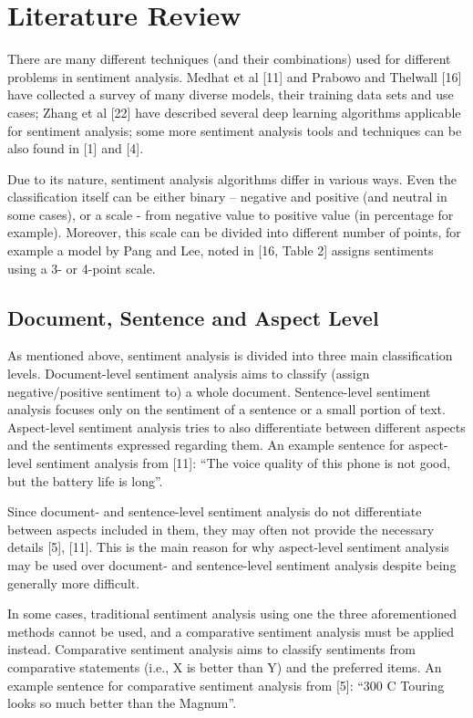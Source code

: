 \documentclass[12pt,journal,compsoc]{IEEEtran}
\begin{document}
\section{Literature Review}
There are many different techniques (and their combinations) used for different problems in sentiment analysis. Medhat et al [11] and Prabowo and Thelwall [16] have collected a survey of many diverse models, their training data sets and use cases; Zhang et al [22] have described several deep learning algorithms applicable for sentiment analysis; some more sentiment analysis tools and techniques can be also found in [1] and [4].

Due to its nature, sentiment analysis algorithms differ in various ways. Even the classification itself can be either binary – negative and positive (and neutral in some cases), or a scale - from negative value to positive value (in percentage for example). Moreover, this scale can be divided into different number of points, for example a model by Pang and Lee, noted in [16, Table 2] assigns sentiments using a 3- or 4-point scale.

\subsection{Document, Sentence and Aspect Level}
As mentioned above, sentiment analysis is divided into three main classification levels. Document-level sentiment analysis aims to classify (assign negative/positive sentiment to) a whole document. Sentence-level sentiment analysis focuses only on the sentiment of a sentence or a small portion of text. Aspect-level sentiment analysis tries to also differentiate between different aspects and the sentiments expressed regarding them. An example sentence for aspect-level sentiment analysis from [11]: “The voice quality of this phone is not good, but the battery life is long”.

Since document- and sentence-level sentiment analysis do not differentiate between aspects included in them, they may often not provide the necessary details [5], [11]. This is the main reason for why aspect-level sentiment analysis may be used over document- and sentence-level sentiment analysis despite being generally more difficult.

In some cases, traditional sentiment analysis using one the three aforementioned methods cannot be used, and a comparative sentiment analysis must be applied instead. Comparative sentiment analysis aims to classify sentiments from comparative statements (i.e., X is better than Y) and the preferred items. An example sentence for comparative sentiment analysis from [5]: “300 C Touring looks so much better than the Magnum”.
\end{document}
